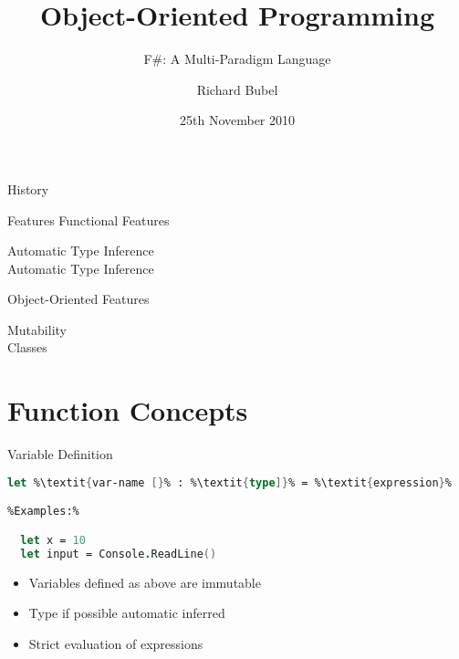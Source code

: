 \documentclass{beamer}
\title[]{Object-Oriented Programming}
\subtitle[F\#]{F\#: A Multi-Paradigm Language} %
\author[Richard Bubel] %
{Richard Bubel}
\institute[CTH]{Chalmers University of Technology}
\date{25th November 2010}%
\newcommand{\Blue}[1]{\color{blue}#1\color{black}}
\begin{document}
\begin{frame}
  \titlepage
\end{frame}

\begin{frame}{History}
\end{frame}

\begin{frame}{Features}
  \Blue{Functional Features}
  \begin{description}
    \item[Automatic Type Inference]
    \item[Automatic Type Inference]
 \end{description}
 
  \Blue{Object-Oriented Features}
  \begin{description}
    \item[Mutability]
    \item[Classes]
 \end{description}

\end{frame}

\section{Function Concepts}

\begin{frame}[fragile]{Variable Definition}
\begin{lstlisting}[language=FSharp, escapechar=\%]
  let %\textit{var-name [}% : %\textit{type]}% = %\textit{expression}%

%Examples:%

  let x = 10
  let input = Console.ReadLine()
\end{lstlisting}
  
\begin{itemize}
\item Variables defined as above are immutable
\item Type if possible automatic inferred
\item Strict evaluation of expressions
\end{itemize}

\end{frame}
\end{document}
